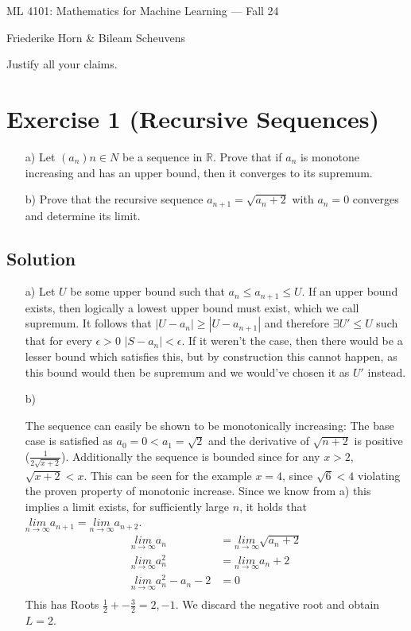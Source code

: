 \documentclass[10pt]{article}
\numberwithin{equation}{section}
\newcommand{\limn}{\underset{n\rightarrow \infty}{lim}}
\begin{document}
\begin{center}
    \sc ML 4101: Mathematics for Machine Learning --- Fall 24
\end{center}

\noindent Friederike Horn \& Bileam Scheuvens

Justify all your claims.
\section*{Exercise 1 (Recursive Sequences)}
\begin{enumerate}
\item[a)]{
  Let $(a_n)n\in N$ be a sequence in $\mathbb{R}$. Prove that if $a_n$ is monotone increasing and has an upper bound, then it converges to its supremum.
  }
\item[b)]{
    Prove that the recursive sequence $a_{n+1} = \sqrt{a_n + 2}$ with $a_n = 0$ converges and determine its limit.
  }
\end{enumerate}
\subsection*{Solution}
\begin{enumerate}
\item[a)]{
    Let $U$ be some upper bound such that $a_n \leq a_{n+1} \leq U$. If an upper bound exists, then logically a lowest upper bound must exist, which we call supremum.
  It follows that $|U-a_n| \geq |U - a_{n+1}|$ and therefore $\exists U' \leq U$ such that for every $\epsilon > 0$ $|S-a_n| < \epsilon$. If it weren't the case, then there would be a lesser bound which satisfies this, but by construction this cannot happen, as this bound would then be supremum and we would've chosen it as $U'$ instead.
  }
\item[b)]{
    The sequence can easily be shown to be monotonically increasing:
    The base case is satisfied as $a_0 = 0 < a_1 = \sqrt{2}$ and the derivative of $\sqrt{n+2}$ is positive ($\frac{1}{2\sqrt{x+2}}$).
    Additionally the sequence is bounded since for any $x > 2$, $\sqrt{x+2}< x$. This can be seen for the example $x=4$, since $\sqrt{6} < 4$ violating the proven property of monotonic increase.
    Since we know from a) this implies a limit exists, for sufficiently large $n$, it holds that $\underset{n\rightarrow \infty}{lim} a_{n+1} = \underset{n\rightarrow \infty}{lim} a_{n+2}$.
    \begin{align*}
      \limn a_n &= \limn \sqrt{a_n+2}\\
      \limn a_n^2 &= \limn a_n+2\\
      \limn a_n^2 -a_n -2 &= 0\\
    \end{align*}
    This has Roots $\frac{1}{2} +- \frac{3}{2} = 2, -1$.
    We discard the negative root and obtain $L = 2$.


  }

\end{enumerate}
\end{document}
